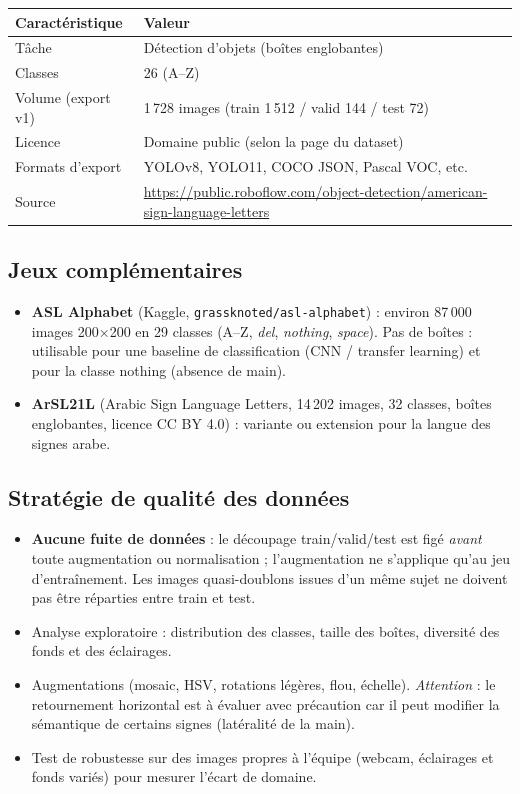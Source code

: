 \documentclass[11pt,a4paper]{article}
\begin{document}
\begin{center}
\begin{tabular}{@{}ll@{}}
\toprule
\textbf{Caractéristique} & \textbf{Valeur} \\ \midrule
Tâche & Détection d'objets (boîtes englobantes) \\
Classes & 26 (A--Z) \\
Volume (export v1) & 1\,728 images (train 1\,512 / valid 144 / test 72) \\
Licence & Domaine public (selon la page du dataset) \\
Formats d'export & YOLOv8, YOLO11, COCO JSON, Pascal VOC, etc. \\
Source & \url{https://public.roboflow.com/object-detection/american-sign-language-letters} \\ \bottomrule
\end{tabular}
\end{center}

\subsection{Jeux complémentaires}
\begin{itemize}[leftmargin=*]
  \item \textbf{ASL Alphabet} (Kaggle, \texttt{grassknoted/asl-alphabet}) : environ 87\,000 images 200$\times$200 en 29 classes (A--Z, \textit{del}, \textit{nothing}, \textit{space}). Pas de boîtes : utilisable pour une baseline de classification (CNN / transfer learning) et pour la classe \og nothing \fg{} (absence de main).
  \item \textbf{ArSL21L} (Arabic Sign Language Letters, 14\,202 images, 32 classes, boîtes englobantes, licence CC BY 4.0) : variante ou extension pour la langue des signes arabe.
\end{itemize}

\subsection{Stratégie de qualité des données}
\begin{itemize}[leftmargin=*]
  \item \textbf{Aucune fuite de données} : le découpage train/valid/test est figé \emph{avant} toute augmentation ou normalisation ; l'augmentation ne s'applique qu'au jeu d'entraînement. Les images quasi-doublons issues d'un même sujet ne doivent pas être réparties entre train et test.
  \item Analyse exploratoire : distribution des classes, taille des boîtes, diversité des fonds et des éclairages.
  \item Augmentations (mosaic, HSV, rotations légères, flou, échelle). \emph{Attention} : le retournement horizontal est à évaluer avec précaution car il peut modifier la sémantique de certains signes (latéralité de la main).
  \item Test de robustesse sur des images propres à l'équipe (webcam, éclairages et fonds variés) pour mesurer l'écart de domaine.
\end{itemize}
\end{document}
